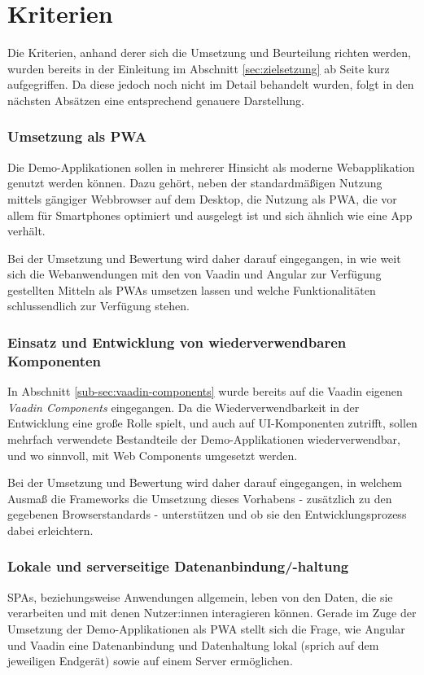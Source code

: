 \documentclass[a4paper,12pt,twoside]{scrreprt}
\begin{document}
\section{Kriterien}
\label{sec:kriterien}
Die Kriterien, anhand derer sich die Umsetzung und Beurteilung richten werden, wurden bereits in der Einleitung im Abschnitt \ref{sec:zielsetzung} ab Seite \pageref{sec:zielsetzung} kurz aufgegriffen. Da diese jedoch noch nicht im Detail behandelt wurden, folgt in den nächsten Absätzen eine entsprechend genauere Darstellung.

\subsubsection*{Umsetzung als \acl{PWA}}
\label{sub-sec:kriterien-pwa}
Die Demo-Applikationen sollen in mehrerer Hinsicht als moderne Webapplikation genutzt werden können. Dazu gehört, neben der standardmäßigen Nutzung mittels gängiger Webbrowser auf dem Desktop, die Nutzung als \ac{PWA}, die vor allem für Smartphones optimiert und ausgelegt ist und sich ähnlich wie eine App verhält.

Bei der Umsetzung und Bewertung wird daher darauf eingegangen, in wie weit sich die Webanwendungen mit den von Vaadin und Angular zur Verfügung gestellten Mitteln als \acp{PWA} umsetzen lassen und welche Funktionalitäten schlussendlich zur Verfügung stehen.

\subsubsection*{Einsatz und Entwicklung von wiederverwendbaren Komponenten}
\label{sub-sec:kriterien-web-components}
In Abschnitt \ref{sub-sec:vaadin-components} wurde bereits auf die Vaadin eigenen \textit{Vaadin Components} eingegangen. Da die Wiederverwendbarkeit in der Entwicklung eine große Rolle spielt, und auch auf \acs{UI}-Komponenten zutrifft, sollen mehrfach verwendete Bestandteile der Demo-Applikationen wiederverwendbar, und wo sinnvoll, mit Web Components umgesetzt werden.

Bei der Umsetzung und Bewertung wird daher darauf eingegangen, in welchem Ausmaß die Frameworks die Umsetzung dieses Vorhabens - zusätzlich zu den gegebenen Browserstandards - unterstützen und ob sie den Entwicklungsprozess dabei erleichtern.

\subsubsection*{Lokale und serverseitige Datenanbindung/-haltung}
\label{sub-sec:kriterien-datenanbindung}
\acp{SPA}, beziehungsweise Anwendungen allgemein, leben von den Daten, die sie verarbeiten und mit denen Nutzer:innen interagieren können. Gerade im Zuge der Umsetzung der Demo-Applikationen als \ac{PWA} stellt sich die Frage, wie Angular und Vaadin eine Datenanbindung und Datenhaltung lokal (sprich auf dem jeweiligen Endgerät) sowie auf einem Server ermöglichen.
\end{document}
